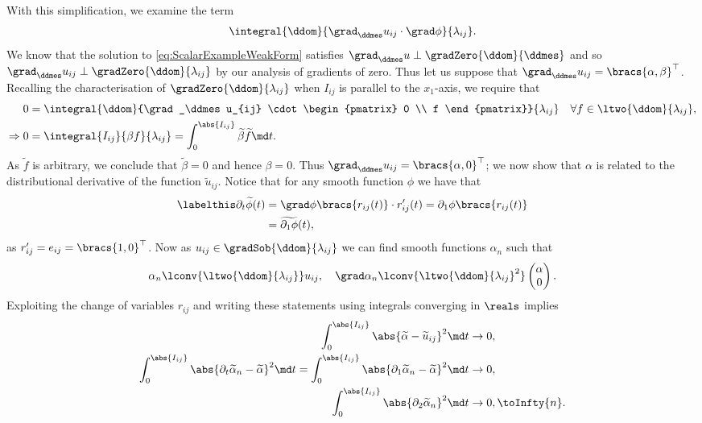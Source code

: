 With this simplification, we examine the term
\begin{align*}
	\integral{\ddom}{\grad_\ddmes u_{ij}\cdot\grad\phi}{\lambda_{ij}}.
\end{align*}
We know that the solution to \eqref{eq:ScalarExampleWeakForm} satisfies $\grad_\ddmes u \perp \gradZero{\ddom}{\ddmes}$ and so $\grad_\ddmes u_{ij} \perp \gradZero{\ddom}{\lambda_{ij}}$ by our analysis of gradients of zero.
Thus let us suppose that $\grad_\ddmes u_{ij} = \bracs{\alpha, \beta}^{\top}$.
Recalling the characterisation of $\gradZero{\ddom}{\lambda_{ij}}$ when $I_{ij}$ is parallel to the $x_1$-axis, we require that
\begin{align*}
	0 &= \integral{\ddom}{\grad_\ddmes u_{ij} \cdot \begin{pmatrix} 0 \\ f \end{pmatrix}}{\lambda_{ij}} \quad \forall f\in\ltwo{\ddom}{\lambda_{ij}}, \\
	\Rightarrow 0 &= \integral{I_{ij}}{\beta f}{\lambda_{ij}}
	= \int_{0}^{\abs{I_{ij}}}\widetilde{\beta}\widetilde{f}\md t.
\end{align*}
As $\widetilde{f}$ is arbitrary, we conclude that $\widetilde{\beta}=0$ and hence $\beta=0$.
Thus $\grad_\ddmes u_{ij} = \bracs{\alpha, 0}^{\top}$; we now show that $\alpha$ is related to the distributional derivative of the function $\widetilde{u}_{ij}$.
Notice that for any smooth function $\phi$ we have that
\begin{align*} \labelthis\label{eq:PartialToTDiff}
	\partial_t\widetilde{\phi}(t) &= \grad\phi\bracs{r_{ij}(t)}\cdot r'_{ij}(t) = \partial_1\phi\bracs{r_{ij}(t)} \\
	&= \widetilde{\partial_1\phi}(t),
\end{align*}
as $r'_{ij}=e_{ij}=\bracs{1,0}^{\top}$.
Now as $u_{ij}\in\gradSob{\ddom}{\lambda_{ij}}$ we can find smooth functions $\alpha_n$ such that
\begin{align*}
	\alpha_n\lconv{\ltwo{\ddom}{\lambda_{ij}}}u_{ij}, \quad \grad\alpha_n\lconv{\ltwo{\ddom}{\lambda_{ij}}^2}\begin{pmatrix} \alpha \\ 0	\end{pmatrix}.
\end{align*}
Exploiting the change of variables $r_{ij}$ and writing these statements using integrals converging in $\reals$ implies
\begin{align*}
	\int_0^{\abs{I_{ij}}}\abs{\widetilde{\alpha}-\widetilde{u}_{ij}}^2 \md t &\rightarrow 0, \\
	\int_0^{\abs{I_{ij}}}\abs{\partial_t\widetilde{\alpha}_n - \widetilde{\alpha}}^2 \md t = \int_0^{\abs{I_{ij}}}\abs{\partial_1\widetilde{\alpha}_n - \widetilde{\alpha}}^2 \md t &\rightarrow 0, \\
	\int_0^{\abs{I_{ij}}}\abs{\partial_2\widetilde{\alpha}_n}^2 \md t &\rightarrow 0, \toInfty{n}.
\end{align*}
